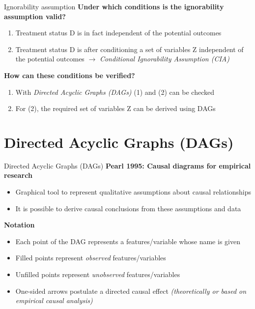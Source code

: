 \documentclass{beamer}\usepackage[]{graphicx}\usepackage[]{color}
\begin{document}
\begin{frame}{Ignorability assumption}
\textbf{Under which conditions is the ignorability assumption valid?}
\begin{enumerate}
  \item Treatment status D is in fact independent of the potential outcomes
  \item Treatment status D is after conditioning a set of variables Z independent of the potential outcomes $\rightarrow$ \textit{Conditional Ignorability Assumption (CIA)}
\end{enumerate}

\textbf{How can these conditions be verified?}
\begin{enumerate}
  \item With \textit{Directed Acyclic Graphs (DAGs)} (1) and (2) can be checked
  \item For (2), the required set of variables Z can be derived using DAGs
\end{enumerate}

\end{frame}


\section{Directed Acyclic Graphs (DAGs)} %

\begin{frame}{Directed Acyclic Graphs (DAGs)}
\textbf{Pearl 1995: Causal diagrams for empirical research}
\begin{itemize}
  \item Graphical tool to represent qualitative assumptions about causal relationships 
  \item It is possible to derive causal conclusions from these assumptions and data
\end{itemize}

\textbf{Notation}
\begin{itemize}
  \item Each point of the DAG represents a features/variable whose name is given
  \item Filled points represent \textit{observed} features/variables
  \item Unfilled points represent \textit{unobserved} features/variables
  \item One-sided arrows postulate a directed causal effect \textit{(theoretically or based on empirical causal analysis)}
\end{itemize}
\end{frame} 
\end{document}
